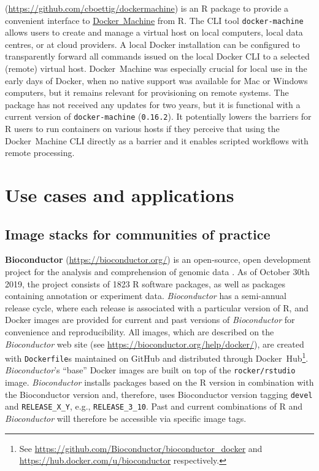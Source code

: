 \textbf{}
(\url{https://github.com/cboettig/dockermachine}) is an R package to
provide a convenient interface to
\href{https://docs.docker.com/machine/overview/}{Docker~Machine} from R.
The CLI tool \texttt{docker-machine} allows users to create and manage a
virtual host on local computers, local data centres, or at cloud
providers. A local Docker installation can be configured to
transparently forward all commands issued on the local Docker CLI to a
selected (remote) virtual host. Docker~Machine was especially crucial
for local use in the early days of Docker, when no native support was
available for Mac or Windows computers, but it remains relevant for
provisioning on remote systems. The package has not received any updates
for two years, but it is functional with a current version of
\texttt{docker-machine} (\texttt{0.16.2}). It potentially lowers the
barriers for R users to run containers on various hosts if they perceive
that using the Docker~Machine CLI directly as a barrier and it enables
scripted workflows with remote processing.

\hypertarget{use-cases-and-applications}{%
\section{Use cases and applications}\label{use-cases-and-applications}}

\label{applications}

\hypertarget{image-stacks-for-communities-of-practice}{%
\subsection{Image stacks for communities of
practice}\label{image-stacks-for-communities-of-practice}}

\textbf{Bioconductor} (\url{https://bioconductor.org/}) is an
open-source, open development project for the analysis and comprehension
of genomic data \citep{gentleman_bioconductor_2004}. As of October 30th
2019, the project consists of 1823 R software packages, as well as
packages containing annotation or experiment data. \emph{Bioconductor}
has a semi-annual release cycle, where each release is associated with a
particular version of R, and Docker images are provided for current and
past versions of \emph{Bioconductor} for convenience and
reproducibility. All images, which are described on the
\emph{Bioconductor} web site (see
\url{https://bioconductor.org/help/docker/}), are created with
\texttt{Dockerfile}s maintained on GitHub and distributed through
Docker~Hub\footnote{See \href{https://github.com/Bioconductor/bioconductor_docker}{https://github.com/Bioconductor/bioconductor\_docker} and \href{https://hub.docker.com/u/bioconductor}{https://hub.docker.com/u/bioconductor} respectively.}.
\emph{Bioconductor}'s ``base'' Docker images are built on top of the
\texttt{rocker/rstudio} image. \emph{Bioconductor} installs packages
based on the R version in combination with the Bioconductor version and,
therefore, uses Bioconductor version tagging \texttt{devel} and
\texttt{RELEASE\_X\_Y}, e.g., \texttt{RELEASE\_3\_10}. Past and current
combinations of R and \emph{Bioconductor} will therefore be accessible
via specific image tags.

